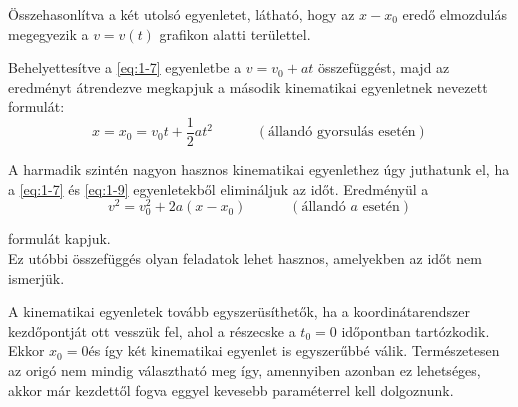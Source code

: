\documentclass[../fizika.tex]{subfiles}
\begin{document}
                \noindent Összehasonlítva a két utolsó egyenletet, látható, hogy az $x-x_0$ eredő elmozdulás megegyezik a $v= v(t)$ grafikon alatti területtel. 

                Behelyettesítve a \eqref{eq:1-7} egyenletbe a $v = v_0 + at$ összefüggést, majd az eredményt átrendezve megkapjuk a második kinematikai egyenletnek nevezett formulát:
                    \begin{equation*} \tag{1-9} \label{eq:1-9}
                        \boxed{x=x_0=v_0t+\frac{1}{2}at^2 \;\;\;\;\;\;\;\;\;\;\; (\text{állandó gyorsulás esetén})} 
                    \end{equation*}

                A harmadik szintén nagyon hasznos kinematikai egyenlethez úgy juthatunk el, ha a \eqref{eq:1-7} és \eqref{eq:1-9} egyenletekből elimináljuk az időt. Eredményül a 
                    \begin{equation*} \tag{1-10} \label{eq:1-10}
                        \boxed{v^2=v_0^2+2a(x-x_0) \;\;\;\;\;\;\;\;\;\;\; (\text{állandó }a\text{ esetén})}
                    \end{equation*}

                \noindent formulát kapjuk. \\ Ez utóbbi összefüggés olyan feladatok lehet hasznos, amelyekben az időt nem ismerjük. 

                A kinematikai egyenletek tovább egyszerüsíthetők, ha a koordinátarendszer kezdőpontját ott vesszük fel, ahol a részecske a $t_0 = 0$ időpontban tartózkodik. Ekkor $x_0 = 0$és így két kinematikai egyenlet is egyszerűbbé válik. Természetesen az origó nem mindig választható meg így, amennyiben azonban ez lehetséges, akkor már kezdettől fogva eggyel kevesebb paraméterrel kell dolgoznunk.
                    
                    \noindent{}
\end{document}
